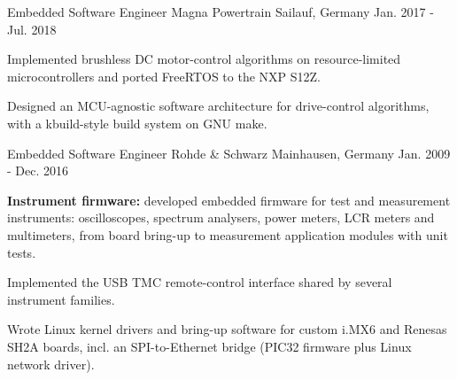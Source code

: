 \begin{cventries}
  \cventry
    {Embedded Software Engineer} %
    {Magna Powertrain} %
    {Sailauf, Germany} %
    {Jan. 2017 - Jul. 2018} %
    {
      \begin{cvitems} %
        \item {Implemented brushless DC motor-control algorithms on resource-limited microcontrollers and ported FreeRTOS to the NXP S12Z.}
        \item {Designed an MCU-agnostic software architecture for drive-control algorithms, with a kbuild-style build system on GNU make.}
      \end{cvitems}
    }

  \cventry
    {Embedded Software Engineer} %
    {Rohde \& Schwarz} %
    {Mainhausen, Germany} %
    {Jan. 2009 - Dec. 2016} %
    {
      \begin{cvitems} %
        \item {\textbf{Instrument firmware:} developed embedded firmware for test and measurement instruments: oscilloscopes, spectrum analysers, power meters, LCR meters and multimeters, from board bring-up to measurement application modules with unit tests.}
        \item {Implemented the USB TMC remote-control interface shared by several instrument families.}
        \item {Wrote Linux kernel drivers and bring-up software for custom i.MX6 and Renesas SH2A boards, incl. an SPI-to-Ethernet bridge (PIC32 firmware plus Linux network driver).}
      \end{cvitems}
    }

\end{cventries}
